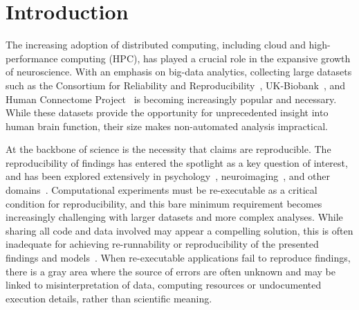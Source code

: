 \documentclass[fleqn,12pt]{SelfArx_ch} %
\affiliation{\textsuperscript{1}\textit{Montréal Neurological Institute, McGill University, Montréal, QC, Canada}}
\affiliation{\textsuperscript{2}\textit{Department of Computer Science and Software Engineering, Concordia University, Montréal, QC, Canada}}
\begin{document}
\flushbottom %
\maketitle %
\thispagestyle{empty} %
\clearpage
\makeabstract

\onecolumn 
{}
\section{Introduction}
The increasing adoption of distributed computing, including cloud and high-performance computing (HPC), has played a
crucial role in the expansive growth of neuroscience. With an emphasis on big-data analytics, collecting large datasets
such as the Consortium for Reliability and Reproducibility~\cite{Zuo2014-sj}, UK-Biobank~\cite{Sudlow2015-dl}, and
Human Connectome Project~\cite{Van_Essen2013-bx} is becoming increasingly popular and necessary. While these datasets
provide the opportunity for unprecedented insight into human brain function, their size makes non-automated analysis
impractical.

At the backbone of science is the necessity that claims are reproducible. The reproducibility of findings has entered
the spotlight as a key question of interest, and has been explored extensively in
psychology~\cite{Open_Science_Collaboration2015-ja}, neuroimaging~\cite{bowring2019exploring,Eklund2016-wo}, and other
domains~\cite{Baker2016-en,Milkowski2018-je}. Computational experiments must be re-executable as a critical condition
for reproducibility, and this bare minimum requirement becomes increasingly challenging with larger datasets and more
complex analyses. While sharing all code and data involved may appear a compelling solution, this is often inadequate
for achieving re-runnability or reproducibility of the presented findings and models~\cite{Milkowski2018-je}. When
re-executable applications fail to reproduce findings, there is a gray area where the source of errors are often
unknown and may be linked to misinterpretation of data, computing resources or undocumented execution details, rather
than scientific meaning.
\end{document}
